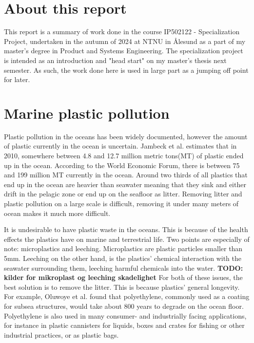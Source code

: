 

\section{About this report}
This report is a summary of work done in the course IP502122 - Specialization Project, undertaken in the autumn of 2024 at NTNU in Ålesund as a part of my master's degree in Product and Systems Engineering. The specialization project is intended as an introduction and "head start" on my master's thesis next semester. As such, the work done here is used in large part as a jumping off point for later.

\section{Marine plastic pollution}
Plastic pollution in the oceans has been widely documented, however the amount of plastic currently in the ocean is uncertain. Jambeck et al.\cite{jambeck_plastic_2015} estimates that in 2010, somewhere between 4.8 and 12.7 million metric tons(MT) of plastic ended up in the ocean. According to the World Economic Forum\cite{world_economic_forum_top_2022}, there is between 75 and 199 million MT currently in the ocean. Around two thirds of all plastics that end up in the ocean are heavier than seawater \cite{isobe_fate_2022} meaning that they sink and either drift in the pelagic zone or end up on the seafloor as litter. Removing litter and plastic pollution on a large scale is difficult, removing it under many meters of ocean makes it much more difficult. 

It is undesirable to have plastic waste in the oceans. This is because of the health effects the plastics have on marine and terrestrial life. Two points are especially of note: microplastics and leeching. Microplastics are plastic particles smaller than 5mm. Leeching on the other hand, is the plastics' chemical interaction with the seawater surrounding them, leeching harmful chemicals into the water. \textbf{TODO: kilder for mikroplast og leeching skadelighet} For both of these issues, the best solution is to remove the litter. This is because plastics' general longevity. For example, Oluwoye et al. \cite{oluwoye_degradation_2023} found that polyethylene, commonly used as a coating for subsea structures, would take about 800 years to degrade on the ocean floor. Polyethylene is also used in many consumer- and industrially facing applications, for instance in plastic cannisters for liquids, boxes and crates for fishing or other industrial practices, or as plastic bags. 

